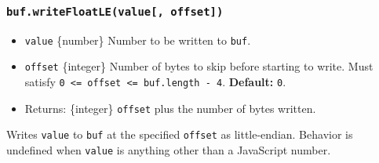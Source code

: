 \begin{Shaded}
\begin{Highlighting}[]
\NormalTok{ \{ }\NormalTok{ \} }\OperatorTok{=} \NormalTok{(}\NormalTok{)}\OperatorTok{;}

\OperatorTok{=} \NormalTok{(}\NormalTok{)}\OperatorTok{;}

\NormalTok{(}\OperatorTok{,} \NormalTok{)}\OperatorTok{;}

\OperatorTok{;}
\end{Highlighting}
\end{Shaded}

\subsubsection{\texorpdfstring{\texttt{buf.writeFloatLE(value{[},\ offset{]})}}{buf.writeFloatLE(value{[}, offset{]})}}\label{buf.writefloatlevalue-offset}

\begin{itemize}
\tightlist
\item
  \texttt{value} \{number\} Number to be written to \texttt{buf}.
\item
  \texttt{offset} \{integer\} Number of bytes to skip before starting to
  write. Must satisfy
  \texttt{0\ \textless{}=\ offset\ \textless{}=\ buf.length\ -\ 4}.
  \textbf{Default:} \texttt{0}.
\item
  Returns: \{integer\} \texttt{offset} plus the number of bytes written.
\end{itemize}

Writes \texttt{value} to \texttt{buf} at the specified \texttt{offset}
as little-endian. Behavior is undefined when \texttt{value} is anything
other than a JavaScript number.

\begin{Shaded}
\begin{Highlighting}[]
\NormalTok{ \{ }\NormalTok{ \} } \OperatorTok{;}

\OperatorTok{=} \NormalTok{(}\NormalTok{)}\OperatorTok{;}

\NormalTok{(}\OperatorTok{,} \NormalTok{)}\OperatorTok{;}

\OperatorTok{;}
\end{Highlighting}
\end{Shaded}

